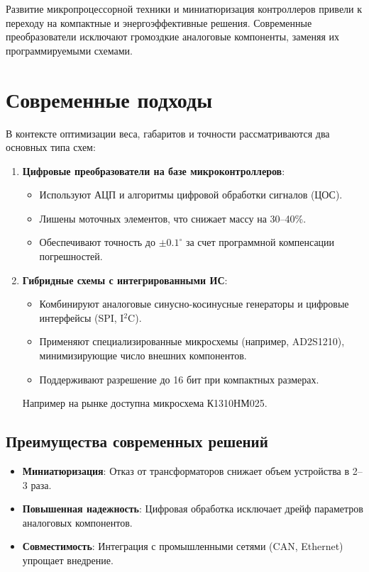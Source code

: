 Развитие микропроцессорной техники и миниатюризация контроллеров привели к переходу на компактные и энергоэффективные решения. 
Современные преобразователи исключают громоздкие аналоговые компоненты, заменяя их программируемыми схемами.

\section{Современные подходы}

В контексте оптимизации веса, габаритов и точности рассматриваются два основных типа схем:

\begin{enumerate}
    \item \textbf{Цифровые преобразователи на базе микроконтроллеров}:
    \begin{itemize}
        \item Используют АЦП и алгоритмы цифровой обработки сигналов (ЦОС).
        \item Лишены моточных элементов, что снижает массу на 30–40\%.
        \item Обеспечивают точность до \(\pm0.1^\circ\) за счет программной компенсации погрешностей.
    \end{itemize}
    
    \item \textbf{Гибридные схемы с интегрированными ИС}: 
    \begin{itemize}
        \item Комбинируют аналоговые синусно-косинусные генераторы и цифровые интерфейсы (SPI, I\(^2\)C).
        \item Применяют специализированные микросхемы (например, AD2S1210), минимизирующие число внешних компонентов.
        \item Поддерживают разрешение до 16 бит при компактных размерах.
    \end{itemize}
    Например на рынке доступна микросхема К1310НМ025. \cite{Spec}
\end{enumerate}

\subsection{Преимущества современных решений}
\begin{itemize}
    \item \textbf{Миниатюризация}: Отказ от трансформаторов снижает объем устройства в 2–3 раза.
    \item \textbf{Повышенная надежность}: Цифровая обработка исключает дрейф параметров аналоговых компонентов.
    \item \textbf{Совместимость}: Интеграция с промышленными сетями (CAN, Ethernet) упрощает внедрение.
\end{itemize}


